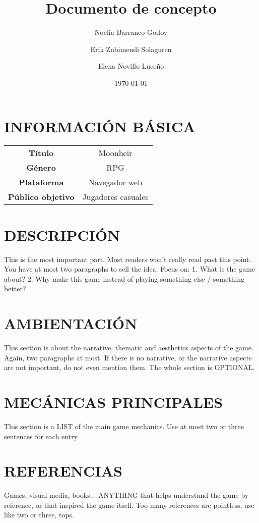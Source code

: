 \documentclass{article}
\title{Documento de concepto} %
\author{Noelia Barranco Godoy
\and Erik Zubimendi Solaguren\and
Elena Novillo Luceño}
\date{\today} %
\begin{document}
    \maketitle %
    
    \section{INFORMACIÓN BÁSICA}
    
    \begin{tabular}{||c|c||}
        \hline
        \textbf{Título} & Moonheir \\
        \textbf{Género} & RPG\\
        \textbf{Plataforma} & Navegador web\\
        \textbf{Público objetivo} & Jugadores casuales\\
        \hline
    \end{tabular}

    \section{DESCRIPCIÓN}
    This is the most important part. Most readers won’t really read past this point. You have at most two paragraphs to sell the idea. Focus on:
    1. What is the game about?
    2. Why make this game instead of playing something else / something better?

    \section{AMBIENTACIÓN}
    This section is about the narrative, thematic and aesthetics aspects of the game. 
    Again, two paragraphs at most. If there is no narrative, or the narrative aspects are not important, do not even mention them. 
    The whole section is OPTIONAL.

    \section{MECÁNICAS PRINCIPALES}
    This section is a LIST of the main game mechanics. Use at most two or three sentences for each entry.

    \section{REFERENCIAS}
    Games, visual media, books... 
    ANYTHING that helps understand the game by reference,
    or that inspired the game itself. Too many references are pointless,
    use like two or three, tops.
\end{document}
